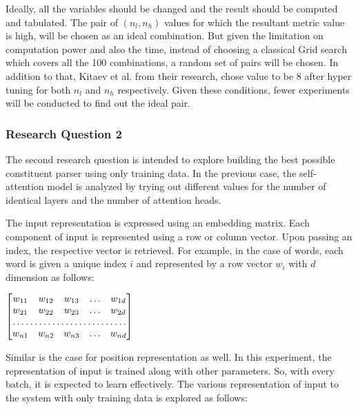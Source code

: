 \documentclass[a4paper, 11pt]{article}
\begin{document}
Ideally, all the variables should be changed and the result should be computed and tabulated. The pair of $(n_l,n_h)$ values for which the resultant metric value is high, will be chosen as an ideal combination. But given the limitation on computation power and also the time, instead of choosing a classical Grid search which covers all the 100 combinations, a random set of pairs will be chosen. In addition to that, Kitaev et al. from their research, chose value to be 8 after hyper tuning for both $n_l$ and $n_h$ respectively. Given these conditions, fewer experiments will be conducted to find out the ideal pair.

\subsubsection{Research Question 2}

The second research question is intended to explore building the best possible constituent parser using only training data. In the previous case, the self-attention model is analyzed by trying out different values for the number of identical layers and the number of attention heads. 

The input representation is expressed using an embedding matrix. Each component of input is represented using a row or column vector. Upon passing an index, the respective vector is retrieved. For example, in the case of words, each word is given a unique index $i$ and represented by a row vector $w_i$ with $d$ dimension as follows:

\begin{center}
$\begin{bmatrix}
    w_{11}       & w_{12} & w_{13} & \dots & w_{1d} \\
    w_{21}       & w_{22} & w_{23} & \dots & w_{2d} \\
    \hdotsfor{5} \\
    w_{n1}       & w_{n2} & w_{n3} & \dots & w_{nd}
\end{bmatrix}
$

\end{center}

Similar is the case for position representation as well. In this experiment, the representation of input is trained along with other parameters. So, with every batch, it is expected to learn effectively. The various representation of input to the system with only training data is explored as follows:
\end{document}
